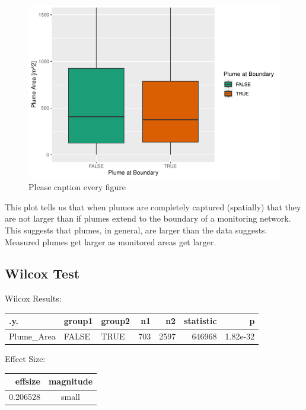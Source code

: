 \documentclass[draft,linenumbers]{agujournal2018}
\begin{document}
\begin{figure}[h]
\includegraphics{CA_Benzene_Plumes_files/figure-latex/plumeAreaCompare-1} \caption{Please caption every figure}\label{fig:plumeAreaCompare}
\end{figure}

This plot tells us that when plumes are completely captured (spatially)
that they are not larger than if plumes extend to the boundary of a
monitoring network. This suggests that plumes, in general, are larger
than the data suggests. Measured plumes get larger as monitored areas
get larger.

\subsection{Wilcox Test}

Wilcox Results:

\captionsetup[table]{labelformat=empty,skip=1pt}
\begin{longtable}{lllrrrr}
\toprule
.y. & group1 & group2 & n1 & n2 & statistic & p \\ 
\midrule
Plume\_Area & FALSE & TRUE & 703 & 2597 & 646968 & 1.82e-32 \\ 
\bottomrule
\end{longtable}

Effect Size:

\captionsetup[table]{labelformat=empty,skip=1pt}
\begin{longtable}{rc}
\toprule
effsize & magnitude \\ 
\midrule
0.206528 & small \\ 
\bottomrule
\end{longtable}
\end{document}
